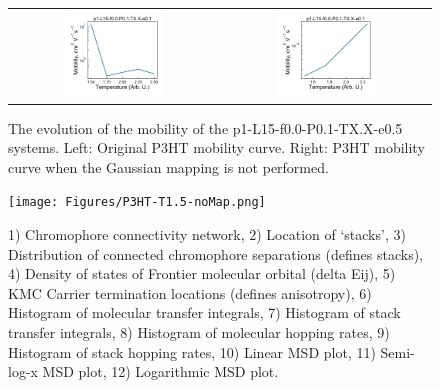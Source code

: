 \documentclass[12pt]{article}
\begin{document}
\begin{figure}[h!]\centering
    \begin{tabular}{cc}
        \includegraphics[width=0.5\textwidth]{Figures/origP3HTMob.pdf}&
        \includegraphics[width=0.5\textwidth]{Figures/newP3HTMob.pdf}
    \end{tabular}
    \caption{The evolution of the mobility of the p1-L15-f0.0-P0.1-TX.X-e0.5 systems.
        Left: Original P3HT mobility curve.
        Right: P3HT mobility curve when the Gaussian mapping is not performed.
}
	\label{fig:mob}
\end{figure}

\clearpage



\begin{figure}[h]\centering
	\texttt{[image: Figures/P3HT-T1.5-noMap.png]}
    \caption{   1) Chromophore connectivity network, 
                2) Location of `stacks', 
                3) Distribution of connected chromophore separations (defines stacks),
                4) Density of states of Frontier molecular orbital (delta Eij),
                5) KMC Carrier termination locations (defines anisotropy),
                6) Histogram of molecular transfer integrals,
                7) Histogram of stack transfer integrals,
                8) Histogram of molecular hopping rates,
                9) Histogram of stack hopping rates,
                10) Linear MSD plot,
                11) Semi-log-x MSD plot,
                12) Logarithmic MSD plot.}
	\label{fig:T1.5}
\end{figure}
\end{document}
